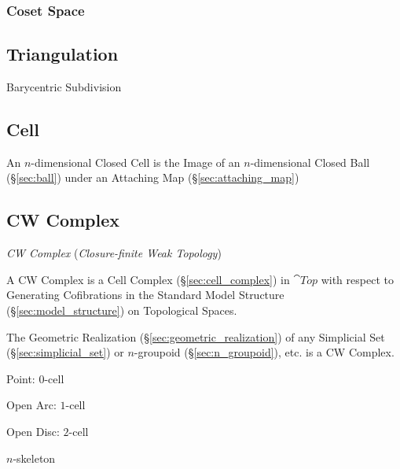 \subsubsection{Coset Space}\label{sec:coset_space}



\subsection{Triangulation}\label{sec:triangulation}

Barycentric Subdivision



\subsection{Cell}\label{sec:topology_cell}

An $n$-dimensional Closed Cell is the Image of an $n$-dimensional
Closed Ball (\S\ref{sec:ball}) under an Attaching Map
(\S\ref{sec:attaching_map})



\subsection{CW Complex}\label{sec:cw_complex}

\emph{CW Complex} (\emph{Closure-finite Weak Topology})

A CW Complex is a Cell Complex (\S\ref{sec:cell_complex}) in
$\cat{Top}$ with respect to Generating Cofibrations in the Standard
Model Structure (\S\ref{sec:model_structure}) on Topological Spaces.

The Geometric Realization (\S\ref{sec:geometric_realization}) of any
Simplicial Set (\S\ref{sec:simplicial_set}) or $n$-groupoid
(\S\ref{sec:n_groupoid}), etc. is a CW Complex.

Point: $0$-cell

Open Arc: $1$-cell

Open Disc: $2$-cell

$n$-skeleton

